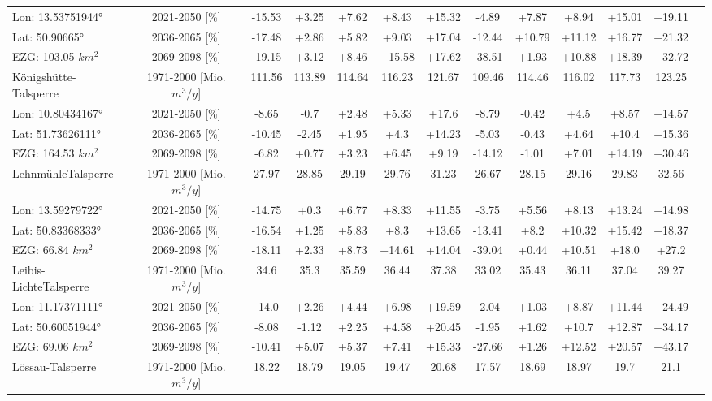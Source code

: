 \begin{longtable}{@{\extracolsep{\fill}}lc|ccccc||cccccc}
\cline{2-12} 
Lon: 13.53751944° & 2021-2050 [\%]  & -15.53 & +3.25 & +7.62 & +8.43 & +15.32 & -4.89 & +7.87 & +8.94 & +15.01 & +19.11\\ 
Lat: 50.90665° & 2036-2065 [\%]  & -17.48 & +2.86 & +5.82 & +9.03 & +17.04 & -12.44 & +10.79 & +11.12 & +16.77 & +21.32\\ 
EZG: 103.05 $km^2$ & 2069-2098 [\%]  & -19.15 & +3.12 & +8.46 & +15.58 & +17.62 & -38.51 & +1.93 & +10.88 & +18.39 & +32.72\\ 
\hline 
Königshütte-Talsperre & 1971-2000 [Mio. $m^3/y$]  & 111.56 & 113.89 & 114.64 & 116.23 & 121.67 & 109.46 & 114.46 & 116.02 & 117.73 & 123.25\\ 
\cline{2-12} 
Lon: 10.80434167° & 2021-2050 [\%]  & -8.65 & -0.7 & +2.48 & +5.33 & +17.6 & -8.79 & -0.42 & +4.5 & +8.57 & +14.57\\ 
Lat: 51.73626111° & 2036-2065 [\%]  & -10.45 & -2.45 & +1.95 & +4.3 & +14.23 & -5.03 & -0.43 & +4.64 & +10.4 & +15.36\\ 
EZG: 164.53 $km^2$ & 2069-2098 [\%]  & -6.82 & +0.77 & +3.23 & +6.45 & +9.19 & -14.12 & -1.01 & +7.01 & +14.19 & +30.46\\ 
\hline 
LehnmühleTalsperre & 1971-2000 [Mio. $m^3/y$]  & 27.97 & 28.85 & 29.19 & 29.76 & 31.23 & 26.67 & 28.15 & 29.16 & 29.83 & 32.56\\ 
\cline{2-12} 
Lon: 13.59279722° & 2021-2050 [\%]  & -14.75 & +0.3 & +6.77 & +8.33 & +11.55 & -3.75 & +5.56 & +8.13 & +13.24 & +14.98\\ 
Lat: 50.83368333° & 2036-2065 [\%]  & -16.54 & +1.25 & +5.83 & +8.3 & +13.65 & -13.41 & +8.2 & +10.32 & +15.42 & +18.37\\ 
EZG: 66.84 $km^2$ & 2069-2098 [\%]  & -18.11 & +2.33 & +8.73 & +14.61 & +14.04 & -39.04 & +0.44 & +10.51 & +18.0 & +27.2\\ 
\hline 
Leibis-LichteTalsperre & 1971-2000 [Mio. $m^3/y$]  & 34.6 & 35.3 & 35.59 & 36.44 & 37.38 & 33.02 & 35.43 & 36.11 & 37.04 & 39.27\\ 
\cline{2-12} 
Lon: 11.17371111° & 2021-2050 [\%]  & -14.0 & +2.26 & +4.44 & +6.98 & +19.59 & -2.04 & +1.03 & +8.87 & +11.44 & +24.49\\ 
Lat: 50.60051944° & 2036-2065 [\%]  & -8.08 & -1.12 & +2.25 & +4.58 & +20.45 & -1.95 & +1.62 & +10.7 & +12.87 & +34.17\\ 
EZG: 69.06 $km^2$ & 2069-2098 [\%]  & -10.41 & +5.07 & +5.37 & +7.41 & +15.33 & -27.66 & +1.26 & +12.52 & +20.57 & +43.17\\ 
\hline 
Lössau-Talsperre & 1971-2000 [Mio. $m^3/y$]  & 18.22 & 18.79 & 19.05 & 19.47 & 20.68 & 17.57 & 18.69 & 18.97 & 19.7 & 21.1\\ 

\end{longtable}
